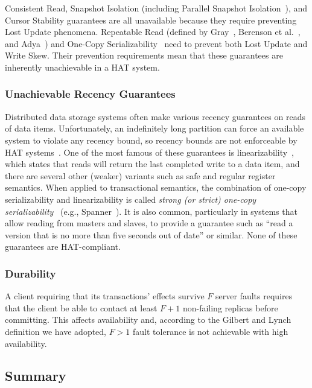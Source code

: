 {Consistent Read, Snapshot Isolation (including Parallel Snapshot
Isolation~\cite{walter}), and Cursor Stability guarantees are all
unavailable because they require preventing Lost Update phenomena.
Repeatable Read (defined by Gray~\cite{gray-isolation}, Berenson et
al.~\cite{ansicritique}, and Adya~\cite{adya}) and One-Copy
Serializability~\cite{1sr} need to prevent both Lost Update and Write
Skew. Their prevention requirements mean that these guarantees are
inherently unachievable in a HAT system.

\subsubsection{Unachievable Recency Guarantees}

Distributed data storage systems often make various recency guarantees
on reads of data items.  Unfortunately, an indefinitely long partition
can force an available system to violate any recency bound, so recency
bounds are not enforceable by HAT systems~\cite{gilbert-cap}. One of
the most famous of these guarantees is
linearizability~\cite{herlihy-art}, which states that reads will
return the last completed write to a data item, and there are several
other (weaker) variants such as safe and regular register
semantics. When applied to transactional semantics, the combination of
one-copy serializability and linearizability is called \textit{strong
  (or strict) one-copy serializability}~\cite{adya} (e.g.,
Spanner~\cite{spanner}). It is also common, particularly in systems
that allow reading from masters and slaves, to provide a guarantee
such as ``read a version that is no more than five seconds out of
date'' or similar. None of these guarantees are HAT-compliant.

\subsubsection{Durability}

A client requiring that its transactions' effects survive $F$ server
faults requires that the client be able to contact at least $F+1$
non-failing replicas before committing. This affects
availability and, according to the Gilbert and Lynch definition we
have adopted, $F>1$ fault tolerance is not achievable with high
availability.


\subsection{Summary}
\label{sec:hat-summary}

}
